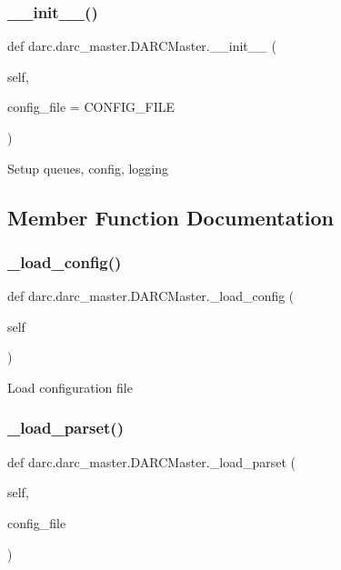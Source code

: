 \subsubsection{\texorpdfstring{\_\_init\_\_()}{\_\_init\_\_()}}
{\footnotesize\ttfamily def darc.\+darc\+\_\+master.\+D\+A\+R\+C\+Master.\+\_\+\+\_\+init\+\_\+\+\_\+ (\begin{DoxyParamCaption}\item[{}]{self,  }\item[{}]{config\+\_\+file = {\ttfamily CONFIG\+\_\+FILE} }\end{DoxyParamCaption})}

\begin{DoxyVerb}Setup queues, config, logging
\end{DoxyVerb}
 

\subsection{Member Function Documentation}
\mbox{\label{classdarc_1_1darc__master_1_1_d_a_r_c_master_ac50d0ce04a289c4db41a65212efe0ea4}} 
\subsubsection{\texorpdfstring{\_load\_config()}{\_load\_config()}}
{\footnotesize\ttfamily def darc.\+darc\+\_\+master.\+D\+A\+R\+C\+Master.\+\_\+load\+\_\+config (\begin{DoxyParamCaption}\item[{}]{self }\end{DoxyParamCaption})\hspace{0.3cm}{\ttfamily [private]}}

\begin{DoxyVerb}Load configuration file
\end{DoxyVerb}
 \mbox{\label{classdarc_1_1darc__master_1_1_d_a_r_c_master_a8adf1a5faacc28a10f432a505122685f}} 
\subsubsection{\texorpdfstring{\_load\_parset()}{\_load\_parset()}}
{\footnotesize\ttfamily def darc.\+darc\+\_\+master.\+D\+A\+R\+C\+Master.\+\_\+load\+\_\+parset (\begin{DoxyParamCaption}\item[{}]{self,  }\item[{}]{config\+\_\+file }\end{DoxyParamCaption})\hspace{0.3cm}{\ttfamily [private]}}

